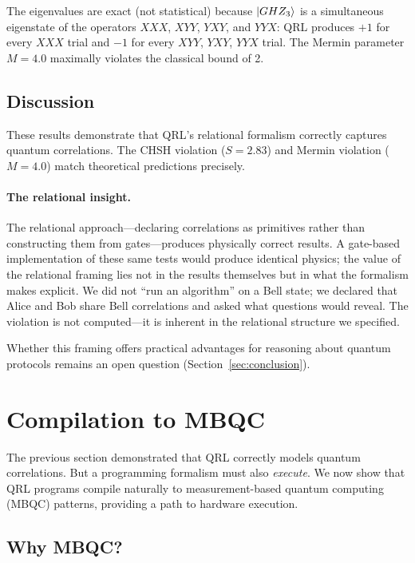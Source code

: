 \documentclass[submission,copyright,creativecommons]{eptcs}
\newcommand{\qrl}{\textsc{QRL}}
\newcommand{\mbqc}{\textsc{MBQC}}
\begin{document}
The eigenvalues are exact (not statistical) because $\ket{GHZ_3}$ is a
simultaneous eigenstate of the operators $XXX$, $XYY$, $YXY$, and $YYX$:
\qrl{} produces $+1$ for every $XXX$ trial and $-1$ for every $XYY$, $YXY$,
$YYX$ trial. The Mermin parameter $M = 4.0$ maximally violates the classical
bound of 2.

\subsection{Discussion}

These results demonstrate that \qrl{}'s relational formalism correctly captures
quantum correlations. The CHSH violation ($S = 2.83$) and Mermin violation
($M = 4.0$) match theoretical predictions precisely.

\paragraph{The relational insight.}
The relational approach---declaring correlations as primitives rather than
constructing them from gates---produces physically correct results. A
gate-based implementation of these same tests would produce identical
physics; the value of the relational framing lies not in the results
themselves but in what the formalism makes explicit. We did not ``run
an algorithm'' on a Bell state; we declared that Alice and Bob share
Bell correlations and asked what questions would reveal. The violation
is not computed---it is inherent in the relational structure we specified.

Whether this framing offers practical advantages for reasoning about
quantum protocols remains an open question (Section~\ref{sec:conclusion}).


\section{Compilation to MBQC}
\label{sec:mbqc}

The previous section demonstrated that \qrl{} correctly models quantum
correlations. But a programming formalism must also \emph{execute}. We now
show that \qrl{} programs compile naturally to measurement-based quantum
computing (\mbqc{}) patterns, providing a path to hardware execution.

\subsection{Why MBQC?}
\end{document}
